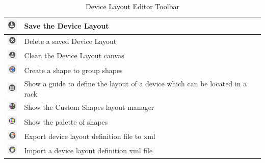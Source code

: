 \documentclass[a4paper]{article}
\begin{document}
	\begin{table}[h!]
		\centering
		\begin{tabular}[h!]{lp{10cm}}
			\includegraphics[width=0.5cm]{img/device_layout_save.png} & Save the Device Layout\\
			\midrule
			\includegraphics[width=0.5cm]{img/device_layout_delete.png} & Delete a saved Device Layout\\
			\midrule
			\includegraphics[width=0.5cm]{img/device_layout_clean.png} & Clean the Device Layout canvas\\
			\midrule
			\includegraphics[width=0.5cm]{img/device_layout_group.png} & Create a shape to group shapes\\
			\midrule
			\includegraphics[width=0.5cm]{img/device_layout_guide.png} & Show a guide to define the layout of a device which can be located in a rack\\
			\midrule
			\includegraphics[width=0.5cm]{img/device_layout_custom_shapes.png} & Show the Custom Shapes layout manager\\
			\midrule
			\includegraphics[width=0.5cm]{img/device_layout_show_palette.png} & Show the palette of shapes\\
			\midrule
			\includegraphics[width=0.5cm]{img/device_layout_export.png} & Export device layout definition file to xml\\
			\midrule
			\includegraphics[width=0.5cm]{img/device_layout_import.png} & Import a device layout definition xml file\\
			\midrule
		\end{tabular}
		\caption{Device Layout Editor Toolbar}
		\label{tab:device_layout_editor_toolbar}
	\end{table}
		
\end{document}
